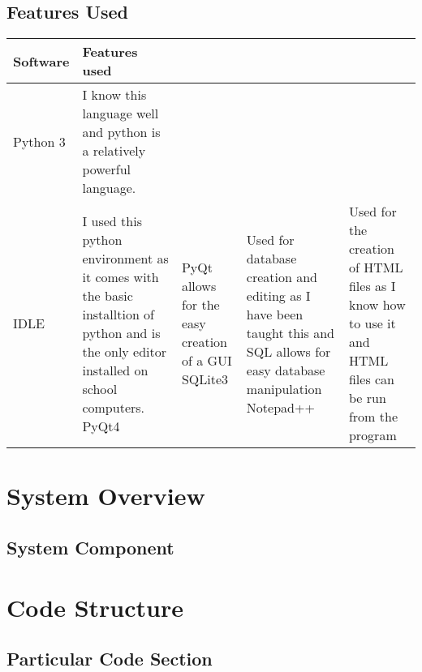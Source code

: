 \subsection{Features Used}
\begin{center}
	\begin{tabular}{|p{2cm}|p{2cm}|p{2cm}|p{2cm}|l}
		\hline
		\textbf{Software}   & \textbf{Features used} \\ \hline
		Python 3 & I know this language well and python is a relatively powerful language.  \\ \hline
		IDLE &  I used this python environment as it comes with the basic installtion of python and is the only editor installed on school computers.
		PyQt4 & PyQt allows for the easy creation of a GUI
		SQLite3 & Used for database creation and editing as I have been taught this and SQL allows for easy database manipulation
		Notepad++ & Used for the creation of HTML files as I know how to use it and HTML files can be run from the program
\end{tabular}
\end{center}


\section{System Overview}

\subsection{System Component}

\section{Code Structure}

\subsection{Particular Code Section}
\begin{comment}
\begin{figure}[H]
    \pythonfile[firstline=5,lastline=10]{./tex/function_programs/print_function.py}
    \caption{The print() function} \label{fig:print_function}
\end{figure}
\end{comment}

